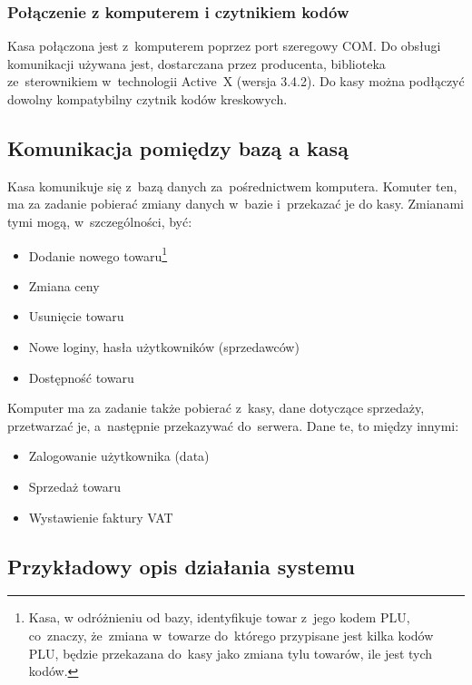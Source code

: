 \subsubsection{Połączenie z komputerem i czytnikiem kodów}
Kasa połączona jest z~komputerem poprzez port szeregowy COM. Do obsługi komunikacji używana jest, dostarczana przez producenta, biblioteka ze~sterownikiem w~technologii Active~X (wersja 3.4.2). Do kasy można podłączyć dowolny kompatybilny czytnik kodów kreskowych.
\subsection{Komunikacja pomiędzy bazą a kasą}
Kasa komunikuje się z~bazą danych za~pośrednictwem komputera. Komuter ten, ma za zadanie pobierać zmiany danych  w~bazie i~przekazać je do kasy. Zmianami tymi mogą, w~szczególności, być:
\begin{itemize}
\item Dodanie nowego towaru\footnote{Kasa, w odróżnieniu od bazy, identyfikuje towar z~jego kodem PLU, co~znaczy, że~zmiana w~towarze do~którego przypisane jest kilka kodów PLU, będzie przekazana do~kasy jako zmiana tylu towarów, ile jest tych kodów.}
\item Zmiana ceny
\item Usunięcie towaru
\item Nowe loginy, hasła użytkowników (sprzedawców)
\item Dostępność towaru 
\end{itemize} 
Komputer ma za zadanie także pobierać z~kasy, dane dotyczące sprzedaży, przetwarzać je, a~następnie przekazywać do~serwera. Dane te, to między innymi:
\begin{itemize}
\item Zalogowanie użytkownika (data)
\item Sprzedaż towaru
\item Wystawienie faktury VAT
\end{itemize} 
\subsection{Przykładowy opis działania systemu}
